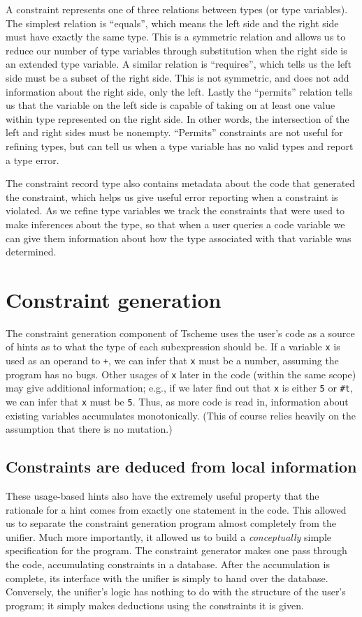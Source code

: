 \documentclass[a4paper]{article}
\newcommand{\T}[1]{\texttt{#1}}
\begin{document}
A constraint represents one of three relations between types (or type 
variables). The simplest relation is ``equals'', which means the left side and 
the right side must have exactly the same type.  This is a symmetric relation 
and allows us to reduce our number of type variables through substitution when 
the right side is an extended type variable.
A similar relation is ``requires'', which tells us the left side must be a 
subset of the right side.  This is not symmetric, and does not add information 
about the right side, only the left.  Lastly the ``permits'' relation tells us 
that the variable on the left side is capable of taking on at least one value 
within type represented on the right side.  In other words, 
the intersection of the left and right sides must be nonempty.  ``Permits'' 
constraints are not useful for refining types, but can tell us when a type 
variable has no valid types and report a type error.  

The constraint record type also contains
metadata about the code that generated the constraint, which helps us give 
useful error reporting when a constraint is violated.  As we refine type 
variables we track the constraints that were used to make inferences about the 
type, so that when a user queries a code variable we can give them information 
about how the type associated with that variable was determined.

\section{Constraint generation}
The constraint generation component of Tscheme uses the user's code as a source
of hints as to what the type of each subexpression should be.  If a variable \T{x}
is used as an operand to \T{+}, we can infer that \T{x} must be a number,
assuming the program has no bugs.  Other usages of \T{x} later in the code
(within the same scope) may give additional information; e.g., if we later find
out that \T{x} is either \T5 or \T{\#t}, we can infer that \T{x} must be \T{5}.
Thus, as more code is read in, information about existing variables accumulates
monotonically.  (This of course relies heavily on the assumption that there is
no mutation.)

\subsection{Constraints are deduced from local information}
These usage-based hints also have the extremely useful property that the
rationale for a hint comes from exactly one statement in the code.  This allowed
us to separate the constraint generation program almost completely from the
unifier.  Much more importantly, it allowed us to build a {\em conceptually}
simple specification for the program.  The constraint generator makes one pass
through the code, accumulating constraints in a database.  After the
accumulation is complete, its interface with the unifier is simply to hand over
the database.  Conversely, the unifier's logic has nothing to do with the
structure of the user's program; it simply makes deductions using the
constraints it is given.
\end{document}
